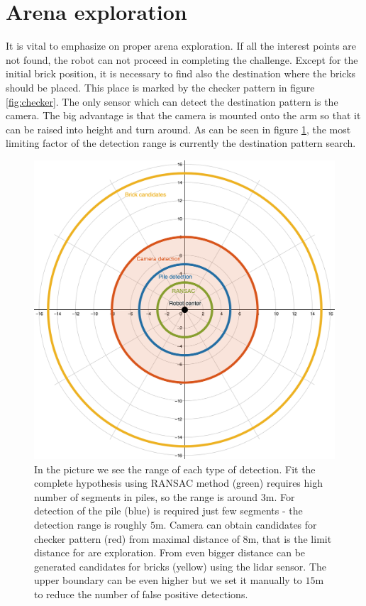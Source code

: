\section{Arena exploration}
It is vital to emphasize on proper arena exploration. If all the interest points are not found, the robot can not proceed in completing the challenge. Except for the initial brick position, it is necessary to find also the destination where the bricks should be placed. This place is marked by the checker pattern in figure \ref{fig:checker}. The only sensor which can detect the destination pattern is the camera. The big advantage is that the camera is mounted onto the arm so that it can be raised into height and turn around. As can be seen in figure \ref{fig:detection_range}, the most limiting factor of the detection range is currently the destination pattern search.

\begin{figure}[H]
	\centering
	\includegraphics[scale=0.38]{fig/detection_range.png}
	\caption[Detection ranges]{In the picture we see the range of each type of detection. Fit the complete hypothesis using RANSAC method (green) requires high number of segments in piles, so the range is around $3$m. For detection of the pile (blue) is required just few segments - the detection range is roughly $5$m. Camera can obtain candidates for checker pattern (red) from maximal distance of $8$m, that is the limit distance for are exploration. From even bigger distance can be generated candidates for bricks (yellow) using the lidar sensor. The upper boundary can be even higher but we set it manually to $15$m to reduce the number of false positive detections.}
	\label{fig:detection_range}
\end{figure}

